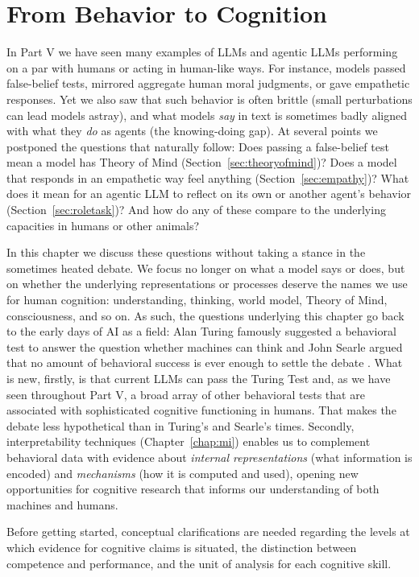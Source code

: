 \section{From Behavior to Cognition}
In Part V we have seen many examples of LLMs and agentic LLMs performing on a par with humans or acting in human-like ways. For instance, models passed false-belief tests, mirrored aggregate human moral judgments, or gave empathetic responses. Yet we also saw that such behavior is often brittle (small perturbations can lead models astray), and what models \emph{say} in text is sometimes badly aligned with what they \emph{do} as agents (the knowing-doing gap). At several points we postponed the questions that naturally follow: Does passing a false-belief test mean a model has Theory of Mind (Section~\ref{sec:theoryofmind})? Does a model that responds in an empathetic way feel anything (Section~\ref{sec:empathy})? What does it mean for an agentic LLM to reflect on its own or another agent's behavior (Section~\ref{sec:roletask})? And how do any of these compare to the underlying capacities in humans or other animals?

In this chapter we discuss these questions without taking a stance in the sometimes heated debate. We focus no longer on what a model says or does, but on whether the underlying representations or processes deserve the names we use for human cognition: understanding, thinking, world model, Theory of Mind, consciousness, and so on. As such, the questions underlying this chapter go back to the early days of AI as a field: Alan Turing famously suggested a behavioral test to answer the question whether machines can think \citep{turing1950computing} and John Searle argued that no amount of behavioral success is ever enough to settle the debate \citep{searle1980minds}. What is new, firstly, is that current LLMs can pass the Turing Test \citep{jones2025turing, gibney2025turing} and, as we have seen throughout Part V, a broad array of other behavioral tests that are associated with sophisticated cognitive functioning in humans. That makes the debate less hypothetical than in Turing's and Searle's times. Secondly, interpretability techniques (Chapter~\ref{chap:mi}) enables us to complement behavioral data with evidence about \emph{internal representations} (what information is encoded) and \emph{mechanisms} (how it is computed and used), opening new opportunities for cognitive research that informs our understanding of both machines and humans. 

Before getting started, conceptual clarifications are needed regarding the levels at which evidence for cognitive claims is situated, the distinction between competence and performance, and the unit of analysis for each cognitive skill.

